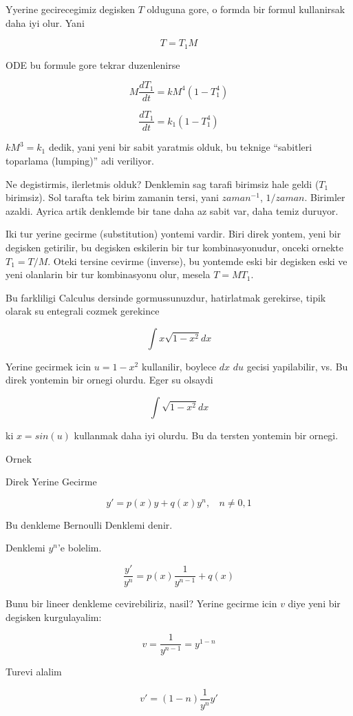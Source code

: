 \documentclass[12pt,fleqn]{article}\usepackage{../common}
\begin{document}
Yyerine gecirecegimiz degisken $T$ olduguna gore, o formda bir formul
kullanirsak daha iyi olur. Yani

\[ T = T_1M \]

ODE bu formule gore tekrar duzenlenirse

\[ M\frac{dT_1}{dt} = kM^4(1-T_1^4)\]

\[ \frac{dT_1}{dt} = k_1(1-T_1^4)  \]

$kM^3 = k_1$ dedik, yani yeni bir sabit yaratmis olduk, bu teknige
``sabitleri toparlama (lumping)'' adi veriliyor.

Ne degistirmis, ilerletmis olduk? Denklemin sag tarafi birimsiz hale
geldi ($T_1$ birimsiz). Sol tarafta tek birim zamanin tersi, yani
$zaman^{-1}$, $1/zaman$. Birimler azaldi. Ayrica artik denklemde bir
tane daha az sabit var, daha temiz duruyor.

Iki tur yerine gecirme (substitution) yontemi vardir. Biri direk
yontem, yeni bir degisken getirilir, bu degisken eskilerin bir tur
kombinasyonudur, onceki ornekte $T_1 = T / M$. Oteki tersine cevirme
(inverse), bu yontemde eski bir degisken eski ve yeni olanlarin bir
tur kombinasyonu olur, mesela $T = MT_1$. 

Bu farkliligi Calculus dersinde gormussunuzdur, hatirlatmak gerekirse,
tipik olarak su entegrali cozmek gerekince

\[ \int x \sqrt{1-x^2} dx \]

Yerine gecirmek icin $u = 1-x^2$ kullanilir, boylece $dx$ $du$ gecisi
yapilabilir, vs. Bu direk yontemin bir ornegi olurdu. Eger su olsaydi

\[ \int \sqrt{1-x^2} dx \]

ki $x = sin(u)$ kullanmak daha iyi olurdu. Bu da tersten yontemin bir ornegi.

Ornek

Direk Yerine Gecirme

\[ y' = p(x)y + q(x)y^n, \ \ \ \  n \neq 0,1 \]

Bu denkleme Bernoulli Denklemi denir. 

Denklemi $y^n$'e bolelim. 

\[ \frac{y'}{y^n} = p(x) \frac{1}{y^{n-1}} + q(x) \]

Bunu bir lineer denkleme cevirebiliriz, nasil? Yerine gecirme icin $v$
diye yeni bir degisken kurgulayalim:

\[ v = \frac{1}{y^{n-1}} = y^{1-n}\]

Turevi alalim

\[ v' = (1-n)\frac{1}{y^n}y' \]
\end{document}

